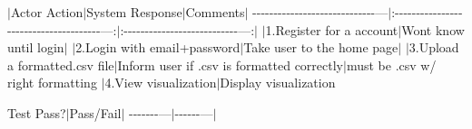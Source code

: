 $\vert$\+Actor Action$\vert$\+System Response$\vert$\+Comments$\vert$ -\/-\/-\/-\/-\/-\/-\/-\/-\/-\/-\/-\/-\/-\/-\/-\/-\/-\/-\/-\/-\/-\/-\/-\/-\/-\/-\/-\/-\/---$\vert$\+:-\/-\/-\/-\/-\/-\/-\/-\/-\/-\/-\/-\/-\/-\/-\/-\/-\/-\/-\/-\/-\/-\/-\/-\/-\/-\/-\/-\/-\/-\/-\/-\/-\/-\/-\/-\/-\/-\/---\+:$\vert$\+:-\/-\/-\/-\/-\/-\/-\/-\/-\/-\/-\/-\/-\/-\/-\/-\/-\/-\/-\/-\/-\/-\/-\/-\/-\/-\/-\/---\+:$\vert$ $\vert$1.Register for a account$\vert$\+Won\textquotesingle{}t know until login$\vert$ $\vert$2.Login with email+password$\vert$\+Take user to the home page$\vert$ $\vert$3.Upload a formatted.\+csv file$\vert$\+Inform user if .csv is formatted correctly$\vert$must be .csv w/ right formatting $\vert$4.View visualization$\vert$\+Display visualization

Test Pass?$\vert$\+Pass/\+Fail$\vert$ -\/-\/-\/-\/-\/-\/-\/---$\vert$-\/-\/-\/-\/-\/-\/---$\vert$ 